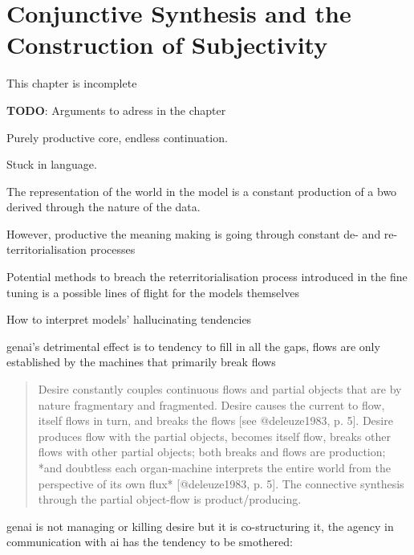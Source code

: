 \chapter{Conjunctive Synthesis and the Construction of Subjectivity}
\begin{orangebox}
	This chapter is incomplete
\end{orangebox}


\begin{tcolorbox}
	\textbf{TODO}: Arguments to adress in the chapter
	\begin{todolist}
		\item Purely productive core, endless continuation.
		\item Stuck in language.
		\item The representation of the world in the model is a constant production
		of a bwo derived through the nature of the data.
		\item However, productive the meaning making is going through constant de- and
		re-territorialisation processes
		\item Potential methods to breach the reterritorialisation process introduced
		in the fine tuning is a possible lines of flight for the models themselves
		\item How to interpret models' hallucinating tendencies
		\item \gls{genai}'s detrimental effect is to tendency to fill in all the
		gaps, flows are only established by the machines that primarily break flows
		\begin{quote}
			Desire constantly couples continuous flows and partial objects that are by nature fragmentary and fragmented. Desire causes the current to flow, itself flows in turn, and breaks the flows [see @deleuze1983, p. 5].  Desire produces flow with the partial objects, becomes itself flow, breaks other flows with other partial objects; both breaks and flows are production; *and doubtless each organ-machine interprets the entire world from the perspective of its own flux* [@deleuze1983, p. 5]. The connective synthesis through the partial object-flow is product/producing.
		\end{quote}
		\item \gls{genai} is not managing or killing desire \cite{creativephilosophy2023} but it is co-structuring it, the agency in communication with \gls{ai} has the tendency to be smothered:


\end{todolist}
\end{tcolorbox}
